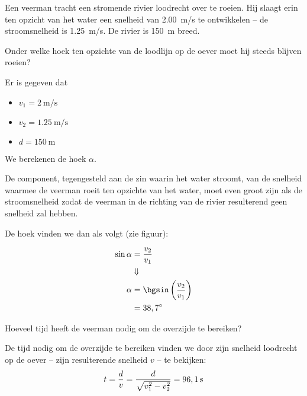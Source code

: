\documentclass{ximera}
\begin{document}
\begin{exercise}
Een veerman tracht een stromende rivier loodrecht over te roeien. Hij slaagt erin ten opzicht van het water een snelheid van \SI{2,00}{m/s} te ontwikkelen -- de stroomsnelheid is \SI{1,25}{m/s}. De rivier is \SI{150}{\meter} breed. 

\begin{question}
 Onder welke hoek ten opzichte van de loodlijn op de oever moet hij steeds blijven roeien?
\begin{oplossing}
Er is gegeven dat

\begin{itemize}
	\item $v_1=\SI{2}{\meter\per\second}$
	\item$v_2=\SI{1,25}{\meter\per\second}$
	\item $d=\SI{150}{\meter}$
\end{itemize}

We berekenen de hoek $\alpha$. 


De component, tegengesteld aan de zin waarin het water stroomt, van de snelheid waarmee de veerman roeit ten opzichte van het water, moet even groot zijn als de stroomsnelheid zodat de veerman in de richting van de rivier resulterend geen snelheid zal hebben.


De hoek vinden we dan als volgt (zie figuur):

\begin{align*}
\sin{\alpha} &= \frac{v_2}{v_1}\\
&\Downarrow\\
\alpha&=\bgsin\left(\frac{v_2}{v_1}\right)\\
&=38,7^\circ
\end{align*}

\end{oplossing}

\end{question}
\begin{question}
Hoeveel tijd heeft de veerman nodig om de overzijde te bereiken? 

\begin{oplossing}
De tijd nodig om de overzijde te bereiken vinden we door zijn snelheid loodrecht op de oever -- zijn resulterende snelheid $v$ -- te bekijken:
	\begin{align*}
		t=\frac{d}{v}=\frac{d}{\sqrt{v_1^2-v_2^2}}=96,1{\rm\,s}
	\end{align*}

\end{oplossing}
\end{question}
\end{exercise}
\end{document}
